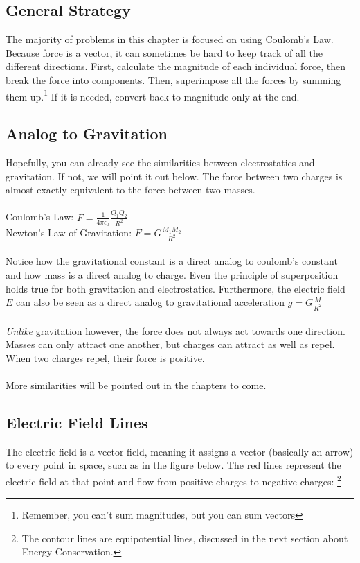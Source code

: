 \subsection{General Strategy}
The majority of problems in this chapter is focused on using Coulomb's Law. Because force is a vector, it can sometimes be hard to keep track of all the different directions. First, calculate the magnitude of each individual force, then break the force into components. Then, superimpose all the forces by summing them up.\footnote{Remember, you can't sum magnitudes, but you can sum vectors} If it is needed, convert back to magnitude only at the end.

\subsection{Analog to Gravitation}
Hopefully, you can already see the similarities between electrostatics and gravitation. If not, we will point it out below. The force between two charges is almost exactly equivalent to the force between two masses.
\\\\
Coulomb's Law: $F=\frac{1}{4\pi\epsilon_0}\frac{Q_1Q_2}{R^2}$
\\
Newton's Law of Gravitation: $F=G\frac{M_1M_2}{R^2}$
\\\\
Notice how the gravitational constant is a direct analog to coulomb's constant and how mass is a direct analog to charge. Even the principle of superposition holds true for both gravitation and electrostatics. Furthermore, the electric field $E$ can also be seen as a direct analog to gravitational acceleration $g=G\frac{M}{R^2}$
\\\\
\emph{Unlike} gravitation however, the force does not always act towards one direction. Masses can only attract one another, but charges can attract as well as repel. When two charges repel, their force is positive.
\\\\
More similarities will be pointed out in the chapters to come.

\subsection{Electric Field Lines}
The electric field is a vector field, meaning it assigns a vector (basically an arrow) to every point in space, such as in the figure below. The red lines represent the electric field at that point and flow from positive charges to negative charges: \footnote{The contour lines are equipotential lines, discussed in the next section about Energy Conservation.}

